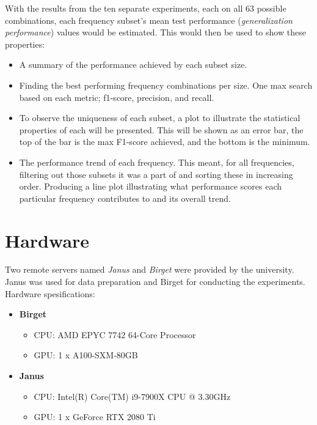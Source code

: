         With the results from the ten separate experiments, each on all 63 possible combinations, each frequency subset's mean test performance (\textit{generalization performance}) values would be estimated. This would then be used to show these properties:
        
        
        \begin{itemize}
            \item A summary of the performance achieved by each subset size.
            \item Finding the best performing frequency combinations per size. One max search based on each metric; f1-score, precision, and recall.
            \item To observe the uniqueness of each subset, a plot to illustrate the statistical properties of each will be presented. This will be shown as an error bar, the top of the bar is the max F1-score achieved, and the bottom is the minimum. %
            \item The performance trend of each frequency. This meant, for all frequencies, filtering out those subsets it was a part of and sorting these in increasing order. Producing a line plot illustrating what performance scores each particular frequency contributes to and its overall trend.
        \end{itemize}
    


\section{Hardware} \label{hardware}
    Two remote servers named \textit{Janus} and \textit{Birget} were provided by the university. Janus was used for data preparation and Birget for conducting the experiments. Hardware spesifications: 
\begin{itemize}
  \item \textbf{Birget}
  \begin{itemize}
    \item CPU: AMD EPYC 7742 64-Core Processor
    \item GPU: 1 x A100-SXM-80GB
  \end{itemize}
  \item \textbf{Janus}
  \begin{itemize}
    \item CPU: Intel(R) Core(TM) i9-7900X CPU @ 3.30GHz
    \item GPU: 1 x GeForce RTX 2080 Ti
  \end{itemize}
\end{itemize}
